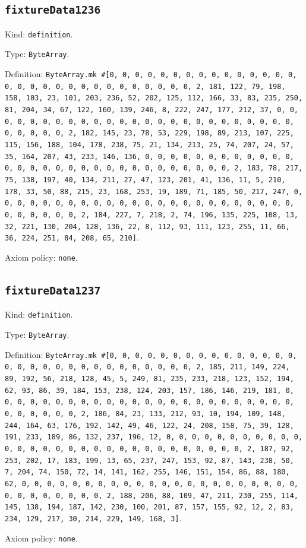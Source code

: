 \documentclass[11pt]{article}
\begin{document}
\subsection*{\texttt{fixtureData1236}}
\noindent Kind: \texttt{definition}.\par
\noindent Type: \texttt{ByteArray}.\par
\noindent Definition: \texttt{ByteArray.mk \#[0, 0, 0, 0, 0, 0, 0, 0, 0, 0, 0, 0, 0, 0, 0, 0, 0, 0, 0, 0, 0, 0, 0, 0, 0, 0, 0, 0, 0, 0, 2, 181, 122, 79, 198, 158, 103, 23, 101, 203, 236, 52, 202, 125, 112, 166, 33, 83, 235, 250, 81, 204, 34, 67, 122, 160, 139, 246, 8, 222, 247, 177, 212, 37, 0, 0, 0, 0, 0, 0, 0, 0, 0, 0, 0, 0, 0, 0, 0, 0, 0, 0, 0, 0, 0, 0, 0, 0, 0, 0, 0, 0, 0, 0, 2, 182, 145, 23, 78, 53, 229, 198, 89, 213, 107, 225, 115, 156, 188, 104, 178, 238, 75, 21, 134, 213, 25, 74, 207, 24, 57, 35, 164, 207, 43, 233, 146, 136, 0, 0, 0, 0, 0, 0, 0, 0, 0, 0, 0, 0, 0, 0, 0, 0, 0, 0, 0, 0, 0, 0, 0, 0, 0, 0, 0, 0, 0, 0, 2, 183, 78, 217, 75, 138, 197, 40, 134, 211, 27, 47, 123, 201, 41, 136, 11, 5, 210, 178, 33, 50, 88, 215, 23, 168, 253, 19, 189, 71, 185, 50, 217, 247, 0, 0, 0, 0, 0, 0, 0, 0, 0, 0, 0, 0, 0, 0, 0, 0, 0, 0, 0, 0, 0, 0, 0, 0, 0, 0, 0, 0, 0, 0, 2, 184, 227, 7, 218, 2, 74, 196, 135, 225, 108, 13, 32, 221, 130, 204, 128, 136, 22, 8, 112, 93, 111, 123, 255, 11, 66, 36, 224, 251, 84, 208, 65, 210]}.\par
\noindent Axiom policy: \texttt{none}.\par
\subsection*{\texttt{fixtureData1237}}
\noindent Kind: \texttt{definition}.\par
\noindent Type: \texttt{ByteArray}.\par
\noindent Definition: \texttt{ByteArray.mk \#[0, 0, 0, 0, 0, 0, 0, 0, 0, 0, 0, 0, 0, 0, 0, 0, 0, 0, 0, 0, 0, 0, 0, 0, 0, 0, 0, 0, 0, 0, 2, 185, 211, 149, 224, 89, 192, 56, 218, 128, 45, 5, 249, 81, 235, 233, 218, 123, 152, 194, 62, 93, 86, 39, 184, 153, 238, 124, 203, 157, 186, 146, 219, 181, 0, 0, 0, 0, 0, 0, 0, 0, 0, 0, 0, 0, 0, 0, 0, 0, 0, 0, 0, 0, 0, 0, 0, 0, 0, 0, 0, 0, 0, 0, 2, 186, 84, 23, 133, 212, 93, 10, 194, 109, 148, 244, 164, 63, 176, 192, 142, 49, 46, 122, 24, 208, 158, 75, 39, 128, 191, 233, 189, 86, 132, 237, 196, 12, 0, 0, 0, 0, 0, 0, 0, 0, 0, 0, 0, 0, 0, 0, 0, 0, 0, 0, 0, 0, 0, 0, 0, 0, 0, 0, 0, 0, 0, 0, 2, 187, 92, 253, 202, 17, 183, 199, 13, 65, 237, 247, 153, 92, 87, 143, 238, 50, 7, 204, 74, 150, 72, 14, 141, 162, 255, 146, 151, 154, 86, 88, 180, 62, 0, 0, 0, 0, 0, 0, 0, 0, 0, 0, 0, 0, 0, 0, 0, 0, 0, 0, 0, 0, 0, 0, 0, 0, 0, 0, 0, 0, 0, 0, 2, 188, 206, 88, 109, 47, 211, 230, 255, 114, 145, 138, 194, 187, 142, 230, 100, 201, 87, 157, 155, 92, 12, 2, 83, 234, 129, 217, 30, 214, 229, 149, 168, 3]}.\par
\noindent Axiom policy: \texttt{none}.\par
\end{document}

